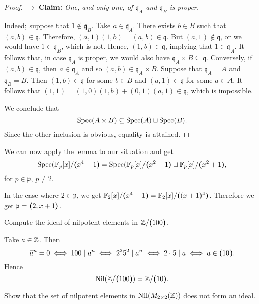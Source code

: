 \begin{solution}
\begin{proof}
        $\to$ \textbf{Claim:} \textit{One, and only one, of\/ $\mathfrak q_A$ and\/ $\mathfrak q_B$ is proper.}
        \small
        \begin{description}
        \newlength{\tolen}
        \settowidth{\tolen}{$\to$}
        \setlength{\itemindent}{-\tolen}
        \item[$\to$] Indeed; suppose that $1\notin\mathfrak q_B$. Take $a\in\mathfrak q_A$. There exists $b\in B$ such that $(a,b)\in\mathfrak q$. Therefore, $(a,1)(1,b)=(a,b)\in\mathfrak q$. But $(a,1)\notin\mathfrak q$, or we would have $1\in\mathfrak q_B$, which is not. Hence, $(1,b)\in\mathfrak q$, implying that $1\in\mathfrak q_A$. It follows that, in case $\mathfrak q_A$ is proper, we would also have $\mathfrak q_A\times B\subseteq\mathfrak q$. Conversely, if $(a,b)\in\mathfrak q$, then $a\in\mathfrak q_A$ and so $(a,b)\in\mathfrak q_A\times B$. Suppose that $\mathfrak q_A=A$ and $\mathfrak q_B=B$. Then $(1,b)\in\mathfrak q$ for some $b\in B$ and $(a,1)\in\mathfrak q$ for some $a\in A$. It follows that $(1,1) = (1,0)(1,b) + (0,1)(a,1) \in\mathfrak q$,
        which is impossible.
        \normalsize
        \end{description}
        
        We conclude that
        $$
            \operatorname{Spec}(A\times B) \subseteq \operatorname{Spec}(A)\sqcup\operatorname{Spec}(B).
        $$
        Since the other inclusion is obvious, equality is attained.
    \end{proof}

    We can now apply the lemma to our situation and get
    $$
        \operatorname{Spec}(\mathbb{F}_p[x]/\textrm{\boldmath$($}x^4-1\textrm{\boldmath$)$}=\operatorname{Spec}(\mathbb{F}_p[x]/\textrm{\boldmath$($}x^2-1\textrm{\boldmath$)$}\sqcup
            \mathbb{F}_p[x]/\textrm{\boldmath$($}x^2+1\textrm{\boldmath$)$},
    $$
    for $p\in\mathfrak p$, $p\ne2$.

    In the case where $2\in\mathfrak p$, we get $\mathbb{F}_2[x]/\textrm{\boldmath$($}x^4-1\textrm{\boldmath$)$}=\mathbb{F}_2[x]/\textrm{\boldmath$($}(x+1)^4\textrm{\boldmath$)$}$. Therefore we get $\mathfrak p=\textrm{\boldmath$($}2,x+1\textrm{\boldmath$)$}$.
\end{solution}

\begin{exr}
    Compute the ideal of nilpotent elements in\/ $\mathbb{Z}/\textrm{\boldmath$($}100\textrm{\boldmath$)$}$.
\end{exr}

\begin{solution}
    Take $a\in\mathbb{Z}$. Then
    $$
        \bar a^n=0\iff 100\mid a^n \iff 2^25^2\mid a^n\iff 2\cdot5\mid a
            \iff a\in\textrm{\boldmath$($}10\textrm{\boldmath$)$}.
    $$
    Hence
    $$
        \operatorname{Nil}(\mathbb{Z}/\textrm{\boldmath$($}100\textrm{\boldmath$)$}) = \mathbb{Z}/\textrm{\boldmath$($}10\textrm{\boldmath$)$}.
    $$
\end{solution}

\begin{exr}
    Show that the set of nilpotent elements in\/ $\operatorname{Nil}(M_{2\times2}(\mathbb{Z}))$ does not form an ideal.
\end{exr}

